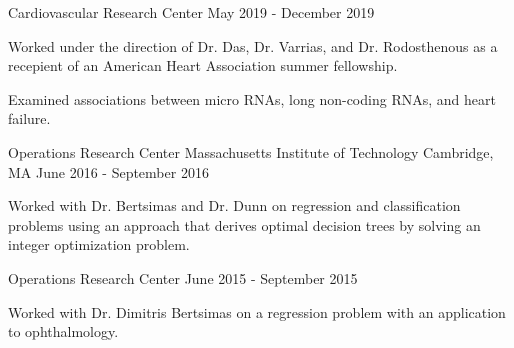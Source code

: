 \begin{cventries}
  \cventry
    {Cardiovascular Research Center} %
    {} %
    {} %
    {May 2019 - December 2019} %
    {
      \begin{cvitems} %
        \item {Worked under the direction of Dr. Das, Dr. Varrias, and Dr. 
        Rodosthenous as a recepient of an American Heart Association summer 
        fellowship.} 
        \item {Examined associations between micro RNAs, long non-coding RNAs, 
        and heart failure.}
      \end{cvitems}
    }

  \cventry
    {Operations Research Center} %
    {Massachusetts Institute of Technology} %
    {Cambridge, MA} %
    {June 2016 - September 2016} %
    {
      \begin{cvitems} %
        \item {Worked with Dr. Bertsimas and Dr. Dunn on regression and
        classification problems using an approach that derives optimal decision
        trees by solving an integer optimization problem.}
      \end{cvitems}
    }

  \cventry
    {Operations Research Center} %
    {} %
    {} %
    {June 2015 - September 2015} %
    {
      \begin{cvitems} %
        \item {Worked with Dr. Dimitris Bertsimas on a regression problem
        with an application to ophthalmology.}
      \end{cvitems}
    }

\end{cventries}
